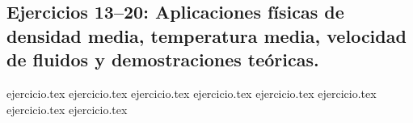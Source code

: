 \subsection*{Ejercicios 13--20: Aplicaciones físicas de densidad media, temperatura media, velocidad de fluidos y demostraciones teóricas.}

\begin{enumerate}
    \setcounter{enumi}{12}
    {ejercicio.tex}
    {ejercicio.tex}
    {ejercicio.tex}
    {ejercicio.tex}
    {ejercicio.tex}
    {ejercicio.tex}
    {ejercicio.tex}
    {ejercicio.tex}
\end{enumerate}
